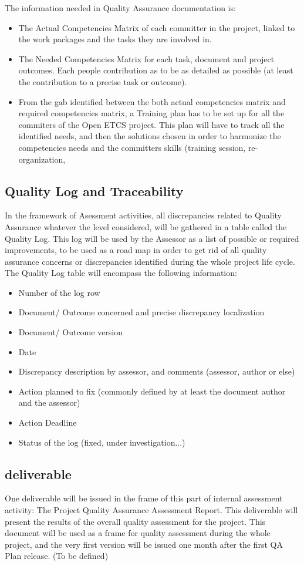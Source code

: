 \documentclass{template/openetcs_report}
\begin{document}
The information needed in Quality Assurance documentation is:
\begin{itemize}
\item The Actual Competencies Matrix of each committer in the project, linked to the work packages and the tasks they are involved in.
\item The Needed Competencies Matrix for each task, document and project outcomes. Each people contribution as to be as detailed as possible (at least the contribution to a precise task or outcome).
\item From the gab identified between the both actual competencies matrix and required competencies matrix, a Training plan has to be set up for all the commiters of the Open ETCS project. This plan will have to track all the identified needs, and then the solutions chosen in order to harmonize the competencies needs and the committers skills (training session, re-organization, 
\end{itemize}

\subsection{Quality Log and Traceability}
In the framework of Asessment activities, all discrepancies related to Quality Assurance whatever the level considered, will be gathered in a table called the Quality Log. This log will be used by the Assessor as a list of possible or required improvements, to be used as a road map in order to get rid of all quality assurance concerns or discrepancies identified during the whole project life cycle.
The Quality Log table will encompass the following information: 
\begin{itemize}
\item Number of the log row
\item Document/ Outcome concerned and precise discrepancy localization
\item Document/ Outcome version
\item Date
\item Discrepancy description by assessor, and comments (assessor, author or else)
\item Action planned to fix (commonly defined by at least the document author and the assessor)
\item Action Deadline
\item Status of the log (fixed, under investigation...)
\end{itemize}

\subsection{deliverable}
One deliverable will be issued in the frame of this part of internal assessment activity: The Project Quality Assurance Assessment Report. This deliverable will present the results of the overall quality assessment for the project.
This document will be used as a frame for quality assessment during the whole project, and the very first version will be issued one month after the first QA Plan release. (To be defined)
\end{document}
